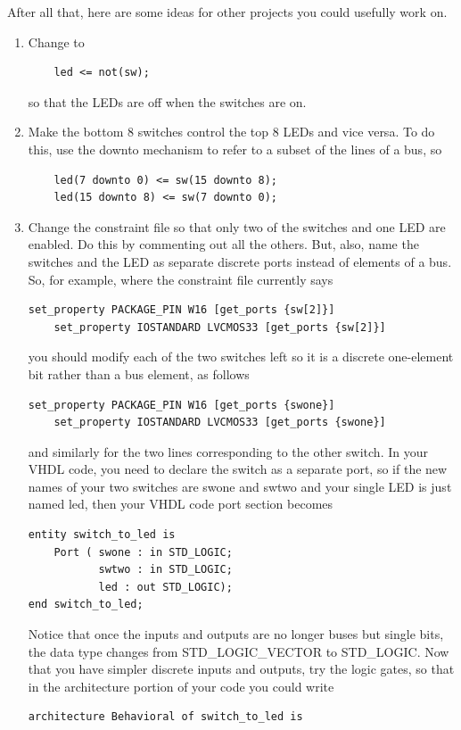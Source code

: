 \documentclass[../physical_computing.tex]{subfiles}
\begin{document}
After all that, here are some ideas for other projects you could usefully work on.

\begin{enumerate}
    \item Change to 
\begin{verbatim}
    led <= not(sw);
\end{verbatim}
    so that the LEDs are off when the switches are on.
    \item Make the bottom 8 switches control the top 8 LEDs and vice versa. To do this, use the downto mechanism to refer to a subset of the lines of a bus, so
\begin{verbatim}
    led(7 downto 0) <= sw(15 downto 8);
    led(15 downto 8) <= sw(7 downto 0);
\end{verbatim}
    \item Change the constraint file so that only two of the switches and one LED are enabled. Do this by commenting out all the others. But, also, name the switches and the LED as separate discrete ports instead of elements of a bus. So, for example, where the constraint file currently says
\begin{verbatim}
set_property PACKAGE_PIN W16 [get_ports {sw[2]}]
	set_property IOSTANDARD LVCMOS33 [get_ports {sw[2]}]
\end{verbatim}
    you should modify each of the two switches left so it is a discrete one-element bit rather than a bus element, as follows
\begin{verbatim}
set_property PACKAGE_PIN W16 [get_ports {swone}]
	set_property IOSTANDARD LVCMOS33 [get_ports {swone}]
\end{verbatim}
and similarly for the two lines corresponding to the other switch. In your VHDL code, you need to declare the switch as a separate port, so if the new names of your two switches are swone and swtwo and your single LED is just named led, then your VHDL code port section becomes
\begin{verbatim}
entity switch_to_led is
    Port ( swone : in STD_LOGIC;
           swtwo : in STD_LOGIC;
           led : out STD_LOGIC);
end switch_to_led;
\end{verbatim}
Notice that once the inputs and outputs are no longer buses but single bits, the data type changes from STD\_LOGIC\_VECTOR to STD\_LOGIC. Now that you have simpler discrete inputs and outputs, try the logic gates, so that in the architecture portion of your code you could write
\begin{verbatim}
architecture Behavioral of switch_to_led is

\end{verbatim}
\end{enumerate}
\end{document}
